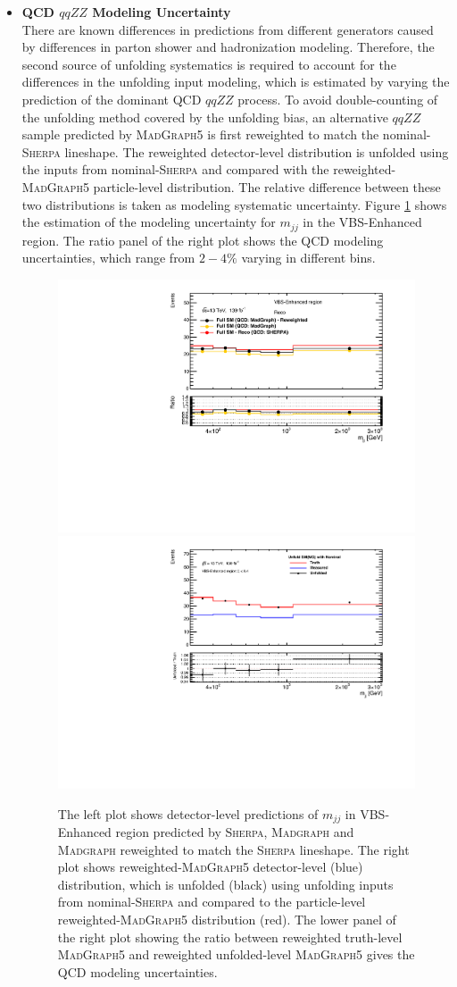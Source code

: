 \begin{itemize}
{    }

    \item{\textbf{QCD $qqZZ$ Modeling Uncertainty}\\ There are known differences in predictions from different generators caused by differences in parton shower and hadronization modeling. Therefore, the second source of unfolding systematics is required to account for the differences in the unfolding input modeling, which is estimated by varying the prediction of the dominant QCD $qqZZ$ process. To avoid double-counting of the unfolding method covered by the unfolding bias, an alternative $qqZZ$ sample predicted by \textsc{MadGraph5} is first reweighted to match the nominal-\textsc{Sherpa} lineshape. The reweighted detector-level distribution is unfolded using the inputs from nominal-\textsc{Sherpa} and compared with the reweighted-\textsc{MadGraph5} particle-level distribution. The relative difference between these two distributions is taken as modeling systematic uncertainty. Figure \ref{fig:QCDModelUnc} shows the estimation of the modeling uncertainty for $m_{jj}$ in the VBS-Enhanced region. The ratio panel of the right plot shows the QCD modeling uncertainties, which range from $2-4\%$ varying in different bins.
    
    \begin{figure}[!htb]
        \centering
        \includegraphics[width=.48\linewidth]{figures/Analysis/Systematics/QCDmodel_Dist.pdf}
        \includegraphics[width=.48\linewidth]{figures/Analysis/Systematics/QCDmodel_Unc.pdf}
        \caption{The left plot shows detector-level predictions of $m_{jj}$ in VBS-Enhanced region predicted by \textsc{Sherpa}, \textsc{Madgraph} and \textsc{Madgraph} reweighted to match the \textsc{Sherpa} lineshape. The right plot shows reweighted-\textsc{MadGraph5} detector-level (blue) distribution, which is unfolded (black) using unfolding inputs from nominal-\textsc{Sherpa} and compared to the particle-level reweighted-\textsc{MadGraph5} distribution (red). The lower panel of the right plot showing the ratio between reweighted truth-level \textsc{MadGraph5} and reweighted unfolded-level \textsc{MadGraph5} gives the QCD modeling uncertainties. \label{fig:QCDModelUnc}}
 \end{figure}  

}
\end{itemize}
